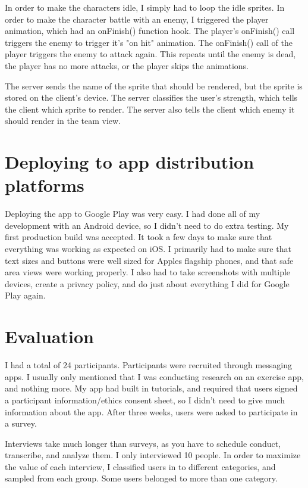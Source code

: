 \documentclass{l4proj}
\begin{document}
In order to make the characters idle, I simply had to loop the idle sprites. In order to make the character battle with an enemy, I triggered the player animation, which had an onFinish() function hook. The player's onFinish() call triggers the enemy to trigger it's "on hit" animation. The onFinish() call of the player triggers the enemy to attack again. This repeats until the enemy is dead, the player has no more attacks, or the player skips the animations.

The server sends the name of the sprite that should be rendered, but the sprite is stored on the client's device. The server classifies the user's strength, which tells the client which sprite to render. The server also tells the client which enemy it should render in the team view.


\section{Deploying to app distribution platforms}
Deploying the app to Google Play was very easy. I had done all of my development with an Android device, so I didn't need to do extra testing. My first production build was accepted. It took a few days to make sure that everything was working as expected on iOS. I primarily had to make sure that text sizes and buttons were well sized for Apples flagship phones, and that safe area views were working properly. I also had to take screenshots with multiple devices, create a privacy policy, and do just about everything I did for Google Play again. 





\section{Evaluation}
I had a total of 24 participants. Participants were recruited through messaging apps. I usually only mentioned that I was conducting research on an exercise app, and nothing more. My app had built in tutorials, and required that users signed a participant information/ethics consent sheet, so I didn't need to give much information about the app. After three weeks, users were asked to participate in a survey.


Interviews take much longer than surveys, as you have to schedule conduct, transcribe, and analyze them. I only interviewed 10 people. In order to maximize the value of each interview, I classified users in to different categories, and sampled from each group. Some users belonged to more than one category. 
\end{document}
